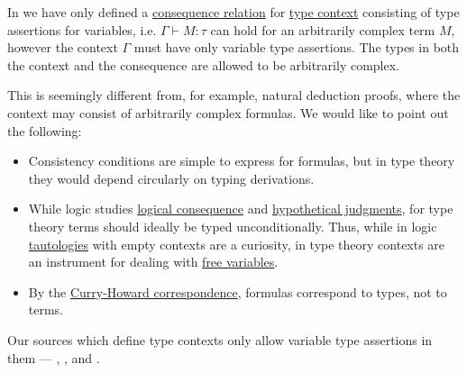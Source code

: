 \begin{remark}\label{rem:type_context_only_variables}
  In  we have only defined a \hyperref[def:consequence_relation]{consequence relation} for \hyperref[def:type_context]{type context} consisting of type assertions for variables, i.e. \( \Gamma \vdash M: \tau \) can hold for an arbitrarily complex term \( M \), however the context \( \Gamma \) must have only variable type assertions. The types in both the context and the consequence are allowed to be arbitrarily complex.

  This is seemingly different from, for example, natural deduction proofs, where the context may consist of arbitrarily complex formulas. We would like to point out the following:
  \begin{itemize}
    \item Consistency conditions are simple to express for formulas, but in type theory they would depend circularly on typing derivations.

    \item While logic studies \hyperref[def:consequence_relation]{logical consequence} and \hyperref[con:hypothetical_judgment]{hypothetical judgments}, for type theory terms should ideally be typed unconditionally. Thus, while in logic \hyperref[def:propositional_tautology]{tautologies} with empty contexts are a curiosity, in type theory contexts are an instrument for dealing with \hyperref[def:lambda_variable_freeness]{free variables}.

    \item By the \hyperref[con:curry_howard_correspondence]{Curry-Howard correspondence}, formulas correspond to types, not to terms.
  \end{itemize}

  Our sources which define type contexts only allow variable type assertions in them ---
  ,
  ,
   and
  .
\end{remark}

